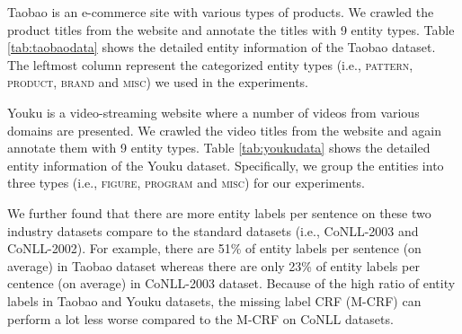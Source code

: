 \begin{table}[h!]
	\centering
	\caption{Data statistics for the datasets.}
	\label{tab:stat}
\end{table}


Taobao is an e-commerce site with various types of products. 
We crawled the product titles from the website and annotate the titles with 9 entity types. 
Table \ref{tab:taobaodata} shows the detailed entity information of the Taobao dataset. 
The leftmost column represent the categorized entity types (i.e., \textsc{pattern}, \textsc{product}, \textsc{brand} and \textsc{misc}) we used in the experiments. 

Youku is a video-streaming website where a number of videos from various domains are presented. 
We crawled the video titles from the website and again annotate them with 9 entity types. 
Table \ref{tab:youkudata} shows the detailed entity information of the Youku dataset. 
Specifically, we group the entities into three types (i.e., \textsc{figure}, \textsc{program} and \textsc{misc}) for our experiments. 

We further found that there are more entity labels per sentence on these two industry datasets compare to the standard datasets (i.e., CoNLL-2003 and CoNLL-2002). 
For example, there are 51\% of entity labels per sentence (on average) in Taobao dataset whereas there are only 23\% of entity labels per centence (on average) in CoNLL-2003 dataset. 
Because of the high ratio of entity labels in Taobao and Youku datasets, the missing label CRF (M-CRF) can perform a lot less worse compared to the M-CRF on CoNLL datasets. 

